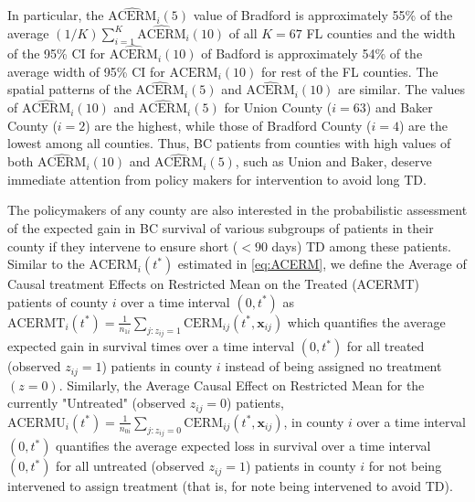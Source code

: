 \documentclass[aoas]{imsart}
\theoremstyle{plain}
\theoremstyle{definition}
\begin{document}
In particular, the $\widehat{\text{ACERM}}_i(5)$ value of Bradford is approximately 55\% of the average $(1/K)\sum_{i=1}^K\widehat{\text{ACERM}}_i(10)$ of all $K=67$ FL counties  and the width of the 95\% CI for $\widehat{\text{ACERM}}_i(10)$ of Badford is approximately 54\% of the average width of 95\% CI for ${\text{ACERM}}_i(10)$ for rest of the FL counties. The spatial patterns of the $\widehat{\text{ACERM}}_i(5)$ and $\widehat{\text{ACERM}}_i(10)$ are similar. The values of $\widehat{\text{ACERM}}_i(10)$ and $\widehat{\text{ACERM}}_i(5)$ for Union County ($i=63$) and Baker County ($i=2$) are the highest, while those of Bradford County ($i=4$) are the lowest among all counties. Thus, BC patients from counties with high values of both $\widehat{\text{ACERM}}_i(10)$ and $\widehat{\text{ACERM}}_i(5)$, such as Union and Baker, deserve immediate attention from policy makers for intervention to avoid long TD.

The policymakers of any county are also interested in the probabilistic assessment of the expected gain in BC survival of various subgroups of patients in their county if they intervene to ensure short ($<90$ days)  TD among these patients. 
Similar to the $\text{ACERM}_i(t^*)$ estimated  in \eqref{eq:ACERM}, we define the Average of Causal treatment Effects on Restricted Mean on the Treated (ACERMT) patients of county $i$ over a time interval $(0, t^*)$ as
$\text{ACERMT}_i(t^*) = \frac{1}{n_{1i}} \sum_{j: z_{ij}=1} \text{CERM}_{ij}(t^*, \mathbf{x}_{ij})$
which quantifies the average expected gain in survival times over a time interval $(0,t^*)$ for all treated (observed $z_{ij}=1$) patients in county $i$ instead of being assigned no treatment $(z=0)$.
Similarly, the Average Causal Effect on Restricted Mean for the currently "Untreated" (observed $z_{ij}=0$) patients, $\text{ACERMU}_i(t^*) = \frac{1}{n_{0i}} \sum_{j: z_{ij}=0} \text{CERM}_{ij}(t^*, \mathbf{x}_{ij})$,  in county $i$  over a time interval $(0, t^*)$ quantifies the average expected loss in survival over a time interval $(0,t^*)$ for all untreated (observed $z_{ij}=1$) patients in county $i$ for not being intervened to assign treatment (that is, for note being intervened to avoid TD). 


\end{document}
